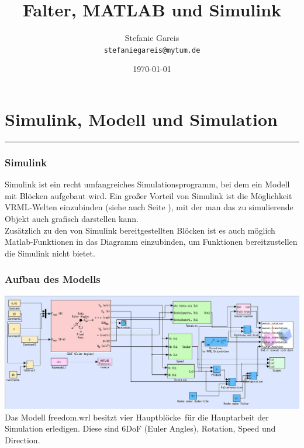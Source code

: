 \documentclass[titlepage, a4paper, ngerman]{article}
\author{Stefanie Gareis\\\texttt{stefaniegareis@mytum.de}}
\title{Falter, MATLAB und Simulink}
\date{\today}
\begin{document}
\setcounter{secnumdepth}{2}
\maketitle
{}
\tableofcontents
\newpage
{}
\setcounter{page}{1}
%
%
\part{Simulink, Modell und Simulation}
\rule{\linewidth}{0.5mm}
\setcounter{section}{0}
\section{Simulink}
Simulink ist ein recht umfangreiches Simulationsprogramm, bei dem ein Modell mit Blöcken aufgebaut wird. Ein großer Vorteil von Simulink ist die Möglichkeit VRML-Welten einzubinden (siehe auch Seite \pageref{vrml}), mit der man das zu simulierende Objekt auch grafisch darstellen kann.\\
Zusätzlich zu den von Simulink bereitgestellten Blöcken ist es auch möglich Matlab-Funktionen in das Diagramm einzubinden, um Funktionen bereitzustellen die Simulink nicht bietet.

\section{Aufbau des Modells}

\includegraphics[width=\linewidth]{modell.png}
\\
Das Modell freedom.wrl besitzt vier \glqq Hauptblöcke\grqq \, für die Hauptarbeit der Simulation erledigen. Diese sind 6DoF (Euler Angles), Rotation, Speed und Direction.
\end{document}
